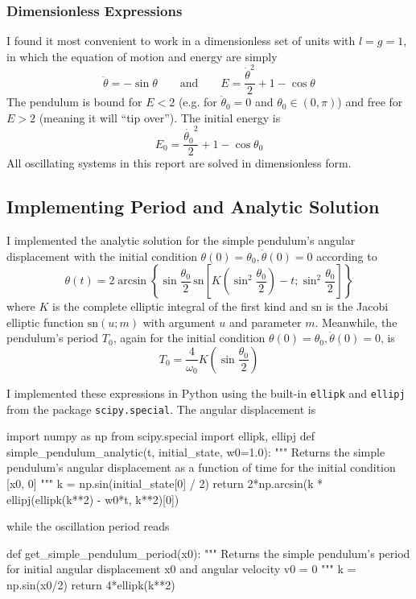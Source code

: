 \documentclass[11pt, a4paper]{article}
\newcommand{\eqtext}[1]{\qquad \text{#1} \qquad}
\begin{document}
\subsubsection{Dimensionless Expressions}
I found it most convenient to work in a dimensionless set of units with $ l = g = 1 $, in which the equation of motion and energy are simply 
\begin{equation*}
	\ddot{\theta} = - \sin \theta \eqtext{and} E = \frac{\dot{\theta}^{2}}{2} + 1 - \cos \theta
\end{equation*}
The pendulum is bound for $ E < 2 $ (e.g. for $ \dot{\theta}_{0} = 0 $ and $ \theta_{0} \in (0, \pi) $) and free for $ E > 2 $ (meaning it will ``tip over''). The initial energy is
\begin{equation}
	E_{0} = \frac{\dot{\theta_{0}}^{2}}{2} + 1 - \cos \theta_{0} \label{newton:eq:E0}
\end{equation}
All oscillating systems in this report are solved in dimensionless form.


\subsection{Implementing Period and Analytic Solution} \label{newton:ss:analytic}
I implemented the analytic solution for the simple pendulum's  angular displacement with the initial condition $ \theta(0) = \theta_{0}, \dot{\theta}(0) = 0 $ according to \cite{belendez}
\begin{equation*}
	\theta(t) = 2 \arcsin\left\{\sin \frac{\theta_{0}}{2} \, \text{sn} \left [K\left(\sin^{2}\frac{\theta_{0}}{2}\right) - t; \sin^{2}\frac{\theta_{0}}{2}\right ]\right\}
\end{equation*}
where $ K $ is the complete elliptic integral of the first kind and $ \text{sn} $ is the Jacobi elliptic function $ \text{sn}(u;m) $ with argument $ u $ and parameter $ m $. Meanwhile, the pendulum's period $ T_{0} $, again for the initial condition $ \theta(0) = \theta_{0}, \dot{\theta}(0) = 0 $, is 
\begin{equation*}
	T_{0} = \frac{4}{\omega_{0}}K\left(\sin \frac{\theta_{0}}{2}\right)
\end{equation*}

I implemented these expressions in Python using the built-in \texttt{ellipk} and \texttt{ellipj} from the package \texttt{scipy.special}. The angular displacement is
\begin{python}
import numpy as np
from scipy.special import ellipk, ellipj
def simple_pendulum_analytic(t, initial_state, w0=1.0):
    """ Returns the simple pendulum's angular displacement as a function of time for the initial condition [x0, 0] """
    k = np.sin(initial_state[0] / 2)
    return 2*np.arcsin(k * ellipj(ellipk(k**2) - w0*t, k**2)[0])
\end{python}
while the oscillation period reads
\begin{python}
def get_simple_pendulum_period(x0):
    """ Returns the simple pendulum's period for initial angular displacement x0 and angular velocity v0 = 0 """
    k = np.sin(x0/2)
    return 4*ellipk(k**2)
\end{python}
\end{document}
